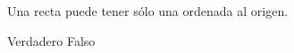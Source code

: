 Una recta puede tener sólo una ordenada al origen.

\begin{oneparchoices}
    \CorrectChoice Verdadero
    \choice Falso
\end{oneparchoices}